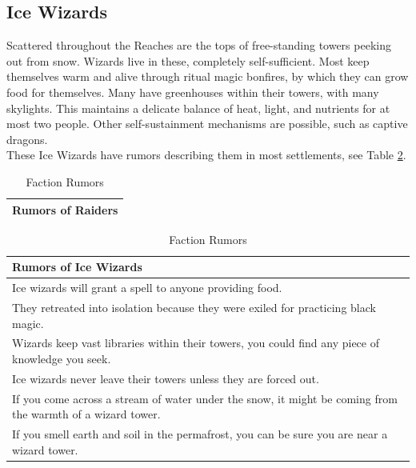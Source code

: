 \documentclass[notitlepage]{article}
\begin{document}
\begin{multicols}{2}
  \subsection*{Ice Wizards}

  Scattered throughout the Reaches are the tops of free-standing towers peeking out from snow.
  Wizards live in these, completely self-sufficient.
  Most keep themselves warm and alive through ritual magic bonfires, by which they can grow food for themselves.
  Many have greenhouses within their towers, with many skylights.
  This maintains a delicate balance of heat, light, and nutrients for at most two people.
  Other self-sustainment mechanisms are possible, such as captive dragons. \\

  These Ice Wizards have rumors describing them in most settlements, see Table \ref{tab:rumors}.

\end{multicols}

\begin{table}[h]
  \centering
  \begin{tabular}{|c|}
    \hline Rumors of Raiders \\ \hline
    
  \end{tabular}
  \begin{tabular}{|p{}|}
    \hline Rumors of Ice Wizards \\ \hline
    Ice wizards will grant a spell to anyone providing food. \\ \hline
    They retreated into isolation because they were exiled for practicing black magic. \\ \hline
    Wizards keep vast libraries within their towers, you could find any piece of knowledge you seek. \\ \hline
    Ice wizards never leave their towers unless they are forced out. \\ \hline
    If you come across a stream of water under the snow, it might be coming from the warmth of a wizard tower. \\ \hline
    If you smell earth and soil in the permafrost, you can be sure you are near a wizard tower. \\ \hline
   \end{tabular}
  \caption{Faction Rumors}
  \label{tab:rumors}
\end{table}
\end{document}
